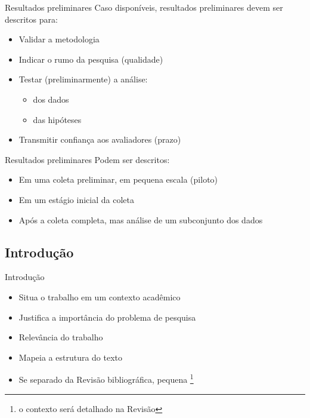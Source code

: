 \documentclass{beamer}
\begin{document}
\begin{frame}{Resultados preliminares}
  \footnotesize
  Caso disponíveis, resultados preliminares devem ser descritos para:
  \bigskip
  \begin{itemize}
    \footnotesize
  \item Validar a metodologia
  \bigskip
  \item Indicar o rumo da pesquisa (qualidade)
  \bigskip
  \item Testar (preliminarmente) a análise:
    \begin{itemize}
      \scriptsize
    \item dos dados
    \item das hipóteses
    \end{itemize}
  \bigskip
  \item Transmitir confiança aos avaliadores (prazo)
  \end{itemize}
\end{frame}

\begin{frame}{Resultados preliminares}
  Podem ser descritos:
  \begin{itemize}
    \footnotesize
  \item Em uma coleta preliminar, em pequena escala (piloto)
  \bigskip
  \item Em um estágio inicial da coleta
  \bigskip
  \item Após a coleta completa, mas análise de um subconjunto dos dados
  \end{itemize}
\end{frame}

\subsection{Introdução}

\begin{frame}{Introdução}
  \begin{itemize}
    \footnotesize
  \item Situa o trabalho em um contexto acadêmico
  \bigskip
  \item Justifica a importância do problema de pesquisa
  \bigskip
  \item Relevância do trabalho
  \bigskip
  \item Mapeia a estrutura do texto
  \bigskip
  \item Se separado da Revisão bibliográfica, pequena \footnote{o
      contexto será detalhado na Revisão}
  \end{itemize}
\end{frame}
\end{document}

